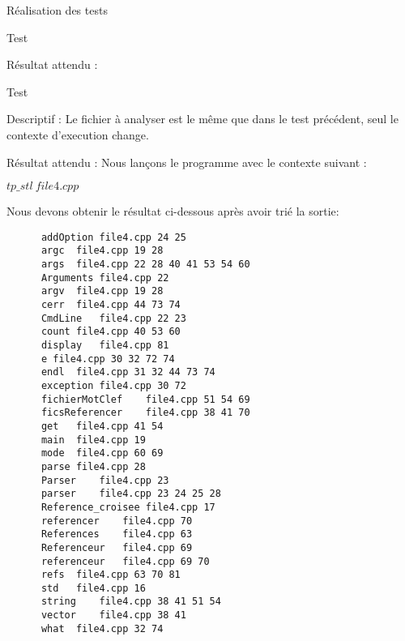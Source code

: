 \documentclass{article}
\begin{document}
\begin{section}{Réalisation des tests}
\begin{subsection}{Test }
\begin{paragraph}{Résultat attendu :}
\begin{listing}[h!]
      \end{listing}
    \end{paragraph}
    
    
  \end{subsection}

  \newpage
  \begin{subsection}{Test }
    \begin{paragraph}{Descriptif :}
      Le fichier à analyser est le même que dans le test précédent, seul le contexte d'execution change.
    \end{paragraph}
    
\begin{paragraph}{Résultat attendu :}
       Nous lançons le programme avec le contexte suivant :  
       \begin{center}
	\textbf{$tp\_stl\ file4.cpp$}
      \end{center}
      
      Nous devons obtenir le résultat ci-dessous après avoir trié la sortie: 
      \begin{listing}[h!]
      \begin{verbatim}
	  addOption	file4.cpp 24 25	
	  argc	file4.cpp 19 28	
	  args	file4.cpp 22 28 40 41 53 54 60	
	  Arguments	file4.cpp 22	
	  argv	file4.cpp 19 28	
	  cerr	file4.cpp 44 73 74	
	  CmdLine	file4.cpp 22 23	
	  count	file4.cpp 40 53 60	
	  display	file4.cpp 81	
	  e	file4.cpp 30 32 72 74	
	  endl	file4.cpp 31 32 44 73 74	
	  exception	file4.cpp 30 72	
	  fichierMotClef	file4.cpp 51 54 69	
	  ficsReferencer	file4.cpp 38 41 70	
	  get	file4.cpp 41 54	
	  main	file4.cpp 19	
	  mode	file4.cpp 60 69	
	  parse	file4.cpp 28	
	  Parser	file4.cpp 23	
	  parser	file4.cpp 23 24 25 28	
	  Reference_croisee	file4.cpp 17	
	  referencer	file4.cpp 70	
	  References	file4.cpp 63	
	  Referenceur	file4.cpp 69	
	  referenceur	file4.cpp 69 70	
	  refs	file4.cpp 63 70 81	
	  std	file4.cpp 16	
	  string	file4.cpp 38 41 51 54	
	  vector	file4.cpp 38 41	
	  what	file4.cpp 32 74	
      \end{verbatim}
  
      \end{listing}
    \end{paragraph}
  \end{subsection}
 
\end{section}
\end{document}
